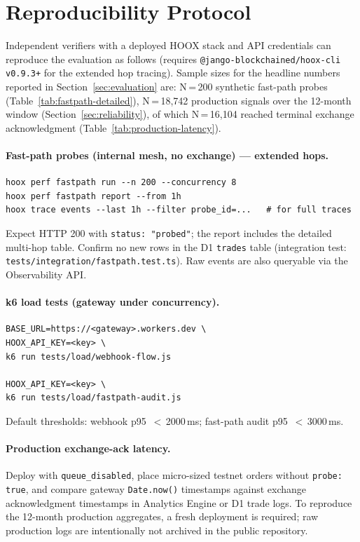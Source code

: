 \section{Reproducibility Protocol}
\label{app:repro}

Independent verifiers with a deployed \textsc{HOOX} stack and API credentials can reproduce the evaluation as follows (requires \texttt{@jango-blockchained/hoox-cli} \texttt{v0.9.3+} for the extended hop tracing). Sample sizes for the headline numbers reported in Section~\ref{sec:evaluation} are: N\,=\,200 synthetic fast-path probes (Table~\ref{tab:fastpath-detailed}), N\,=\,18{,}742 production signals over the 12-month window (Section~\ref{sec:reliability}), of which N\,=\,16{,}104 reached terminal exchange acknowledgment (Table~\ref{tab:production-latency}).

\paragraph{Fast-path probes (internal mesh, no exchange) --- extended hops.}
\begin{lstlisting}
hoox perf fastpath run --n 200 --concurrency 8
hoox perf fastpath report --from 1h
hoox trace events --last 1h --filter probe_id=...   # for full traces
\end{lstlisting}
Expect HTTP 200 with \texttt{status: "probed"}; the report includes the detailed multi-hop table. Confirm no new rows in the D1 \texttt{trades} table (integration test: \texttt{tests/integration/fastpath.test.ts}). Raw events are also queryable via the Observability API.

\paragraph{k6 load tests (gateway under concurrency).}
\begin{lstlisting}
BASE_URL=https://<gateway>.workers.dev \
HOOX_API_KEY=<key> \
k6 run tests/load/webhook-flow.js

HOOX_API_KEY=<key> \
k6 run tests/load/fastpath-audit.js
\end{lstlisting}
Default thresholds: webhook p95~$<$\,2000\,ms; fast-path audit p95~$<$\,3000\,ms.

\paragraph{Production exchange-ack latency.} Deploy with \texttt{queue\_disabled}, place micro-sized testnet orders without \texttt{probe: true}, and compare gateway \texttt{Date.now()} timestamps against exchange acknowledgment timestamps in Analytics Engine or D1 trade logs. To reproduce the 12-month production aggregates, a fresh deployment is required; raw production logs are intentionally not archived in the public repository.


